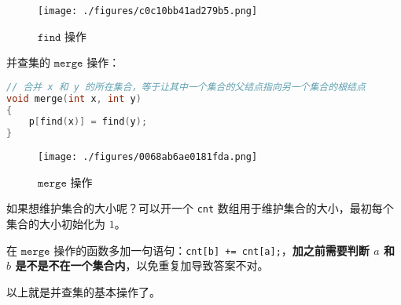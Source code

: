 \begin{figure}[ht]
\centering
\texttt{[image: ./figures/c0c10bb41ad279b5.png]}
\caption{$\mathtt{find}$ 操作} \label{fig_DSU_1}
\end{figure}

并查集的 $\mathtt{merge}$ 操作：
\begin{lstlisting}[language=cpp]
// 合并 x 和 y 的所在集合，等于让其中一个集合的父结点指向另一个集合的根结点
void merge(int x, int y)
{
    p[find(x)] = find(y);
}
\end{lstlisting}


\begin{figure}[ht]
\centering
\texttt{[image: ./figures/0068ab6ae0181fda.png]}
\caption{$\mathtt{merge}$ 操作} \label{fig_DSU_2}
\end{figure}

如果想维护集合的大小呢？可以开一个 \verb|cnt| 数组用于维护集合的大小，最初每个集合的大小初始化为 $1$。

在 $\mathtt{merge}$ 操作的函数多加一句语句：\verb|cnt[b] += cnt[a];|，\textbf{加之前需要判断 $a$ 和 $b$ 是不是不在一个集合内}，以免重复加导致答案不对。


以上就是并查集的基本操作了。